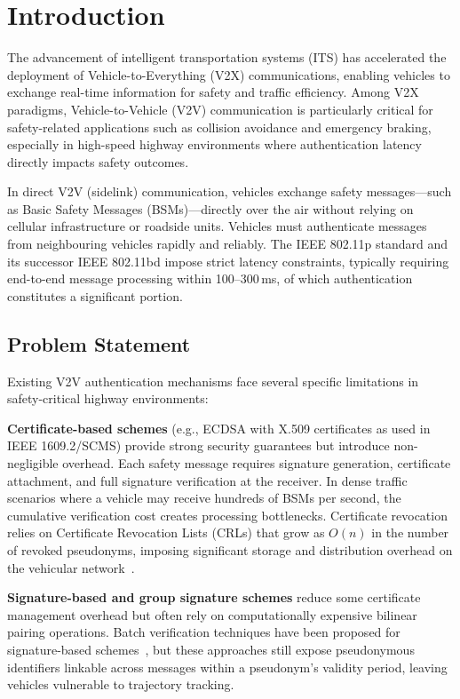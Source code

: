 \section{Introduction}

The advancement of intelligent transportation systems (ITS) has accelerated the
deployment of Vehicle-to-Everything (V2X) communications, enabling vehicles to
exchange real-time information for safety and traffic efficiency. Among V2X paradigms,
Vehicle-to-Vehicle (V2V) communication is particularly critical for safety-related
applications such as collision avoidance and emergency braking, especially in
high-speed highway environments where authentication latency directly impacts safety
outcomes.

In direct V2V (sidelink) communication, vehicles exchange safety messages---such as
Basic Safety Messages (BSMs)---directly over the air without relying on cellular
infrastructure or roadside units. Vehicles must authenticate messages from
neighbouring vehicles rapidly and reliably. The IEEE 802.11p standard and its
successor IEEE 802.11bd impose strict latency constraints, typically requiring
end-to-end message processing within 100--300\,ms, of which authentication
constitutes a significant portion.

\subsection{Problem Statement}

Existing V2V authentication mechanisms face several specific limitations in
safety-critical highway environments:

\textbf{Certificate-based schemes} (e.g., ECDSA with X.509 certificates as used in
IEEE 1609.2/SCMS) provide strong security guarantees but introduce non-negligible
overhead. Each safety message requires signature generation, certificate attachment,
and full signature verification at the receiver. In dense traffic scenarios where a
vehicle may receive hundreds of BSMs per second, the cumulative verification cost
creates processing bottlenecks. Certificate revocation relies on Certificate
Revocation Lists (CRLs) that grow as $O(n)$ in the number of revoked pseudonyms,
imposing significant storage and distribution overhead on the vehicular
network~\cite{scopelliti2024}.

\textbf{Signature-based and group signature schemes} reduce some certificate
management overhead but often rely on computationally expensive bilinear pairing
operations. Batch verification techniques have been proposed for signature-based
schemes~\cite{zhang2024}, but these approaches still expose pseudonymous identifiers
linkable across messages within a pseudonym's validity period, leaving vehicles
vulnerable to trajectory tracking.

